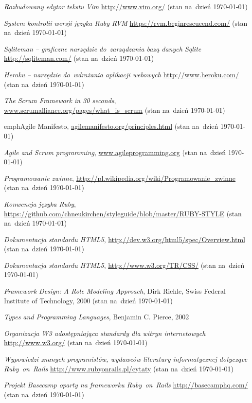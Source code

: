 \begin{thebibliography}{99}
   \emph{Rozbudowany edytor tekstu Vim} \url{http://www.vim.org/} (stan na~dzień \today)

   \emph{System kontrolii wersji języka Ruby RVM} \url{https://rvm.beginrescueend.com/} (stan na~dzień \today)

   \emph{Sqliteman -- graficzne narzędzie do~zarządzania bazą danych Sqlite} \url{http://sqliteman.com/} (stan na~dzień \today)

   \emph{Heroku -- narzędzie do~wdrażania aplikacji webowych} \url{http://www.heroku.com/} (stan na~dzień \today)

   \emph{The Scrum Framework in 30 seconds}, \url{www.scrumalliance.org/pages/what_is_scrum} (stan na~dzień \today)

   emph{Agile Manifesto}, \url{agilemanifesto.org/principles.html} (stan na~dzień \today)

   \emph{Agile and Scrum programming}, \url{www.agileprogramming.org} (stan na~dzień \today)

   \emph{Programowanie zwinne}, \url{http://pl.wikipedia.org/wiki/Programowanie_zwinne} (stan na~dzień \today)

   \emph{Konwencja języka Ruby}, \url{https://github.com/chneukirchen/styleguide/blob/master/RUBY-STYLE} (stan na~dzień \today)

   \emph{Dokumentacja standardu HTML5}, \url{http://dev.w3.org/html5/spec/Overview.html} (stan na~dzień \today)

   \emph{Dokumentacja standardu HTML5}, \url{http://www.w3.org/TR/CSS/} (stan na~dzień \today)

   \emph{Framework Design: A Role Modeling Approach}, Dirk Riehle, Swiss Federal Institute of Technology, 2000 (stan na~dzień \today)

   \emph{Types and Programming Languages}, Benjamin C. Pierce, 2002

   \emph{Organizacja W3 udostępniająca standardy dla witryn internetowych} \url{http://www.w3.org/} (stan na~dzień \today)

   \emph{Wypowiedzi znanych programistów, wydawców literatury informatycznej dotyczące Ruby~on~Rails} \url{http://www.rubyonrails.pl/cytaty} (stan na~dzień \today)

   \emph{Projekt Basecamp oparty na frameworku Ruby~on~Rails} \url{http://basecamphq.com/} (stan na~dzień \today)


\end{thebibliography}
